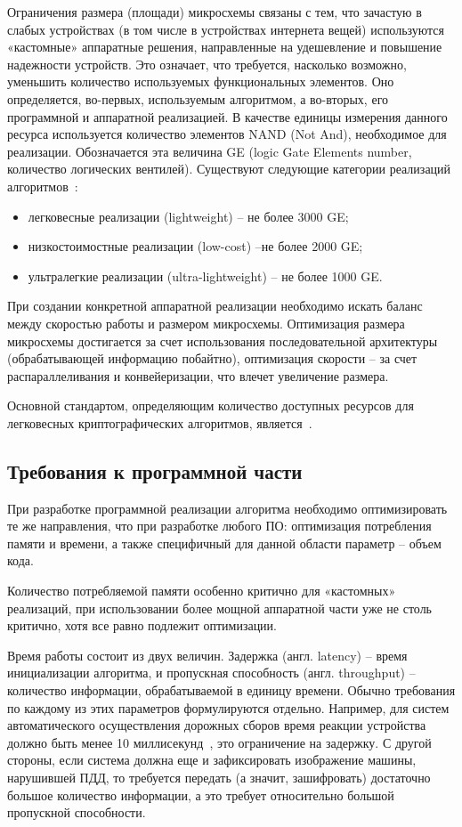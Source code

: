 Ограничения размера (площади) микросхемы связаны с тем, что зачастую в слабых устройствах (в том числе в устройствах интернета вещей) используются «кастомные» аппаратные решения, направленные на удешевление и повышение надежности устройств. Это означает, что требуется, насколько возможно, уменьшить количество используемых функциональных элементов. Оно определяется, во-первых, используемым алгоритмом, а во-вторых, его программной и аппаратной реализацией. В качестве единицы измерения данного ресурса используется количество элементов NAND (Not And), необходимое для реализации. Обозначается эта величина GE (logic Gate Elements number, количество логических вентилей). Существуют следующие категории реализаций алгоритмов~\cite{src25}:
\begin{itemize}
	\item легковесные реализации (lightweight) – не более 3000 GE;
	\item низкостоимостные реализации (low-cost) –не более 2000 GE;
	\item ультралегкие реализации (ultra-lightweight) – не более 1000 GE.
\end{itemize}

При создании конкретной аппаратной реализации необходимо искать баланс между скоростью работы и размером микросхемы. Оптимизация размера микросхемы достигается за счет использования последовательной архитектуры (обрабатывающей информацию побайтно), оптимизация скорости – за счет распараллеливания и конвейеризации, что влечет увеличение размера.

Основной стандартом, определяющим количество доступных ресурсов для легковесных криптографических алгоритмов, является~\cite{src26}.

\subsection{Требования к программной части} %

При разработке программной реализации алгоритма необходимо оптимизировать те же направления, что при разработке любого ПО: оптимизация потребления памяти и времени, а также специфичный для данной области параметр – объем кода.

Количество потребляемой памяти особенно критично для «кастомных» реализаций, при использовании более мощной аппаратной части уже не столь критично, хотя все равно подлежит оптимизации.

Время работы состоит из двух величин. Задержка (англ. latency) – время инициализации алгоритма, и пропускная способность (англ. throughput) – количество информации, обрабатываемой в единицу времени. Обычно требования по каждому из этих параметров формулируются отдельно. Например, для систем автоматического осуществления дорожных сборов время реакции устройства должно быть менее 10 миллисекунд~\cite{src27}, это ограничение на задержку. С другой стороны, если система должна еще и зафиксировать изображение машины, нарушившей ПДД, то требуется передать (а значит, зашифровать) достаточно большое количество информации, а это требует относительно большой пропускной способности.

